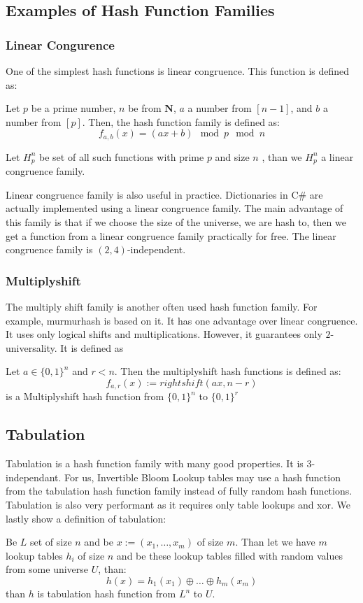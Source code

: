 \subsection{Examples of Hash Function Families}

\subsubsection{Linear Congurence}
One of the simplest hash functions is linear congruence. This function is defined as:
\begin{defn}
    Let \( p \) be a prime number, \(n\)  be from $\mathbf{N}$,  \( a \) a number from \([n-1]\), and \( b \) a number from \([p]\). Then, the hash function family is defined as:
    \[ f_{a,b}(x) = (ax + b) \mod p \mod n\]

    Let $H_p^n$ be set of all such functions with prime $p$ and size $n$ , than we $H_p^n$ a linear congruence family.
\end{defn}
 
Linear congruence family is also useful in practice. Dictionaries in C\# are actually implemented using a linear congruence family. The main advantage of this family is that if we choose the size of the universe, we are hash to, then we get a function from a linear congruence family practically for free. The linear congruence family is $(2,4)$-independent. 

\subsubsection{Multiplyshift}
The multiply shift family is another often used hash function family. For example, murmurhash is based on it. It has one advantage over linear congruence. It uses only logical shifts and multiplications. However, it guarantees only $2$-universality. It is defined as 
\begin{defn}
Let $a \in \{0,1\}^n$ and $r < n$. Then the multiplyshift hash functions is defined as:
$$f_{a,r}(x) :=  rightshift(ax, n - r) $$
is a Multiplyshift hash function from $\{0,1\}^n$ to $\{0,1\}^r$
\end{defn}
\subsection{Tabulation}
Tabulation is a hash function family with many good properties. It is $3$-independant. For us, Invertible Bloom Lookup tables may use a hash function from the tabulation hash function family instead of fully random hash functions. \cite{10.1145/3068772} Tabulation is also very performant as it requires only table lookups and xor.\cite{10.1145/3068772}
We lastly show a definition of tabulation:
\begin{defn}
Be $L$ set of size $n$ and be $x := (x_1, \dots, x_m)$ of size $m$. Than let we have $m$ lookup tables $h_i$ of size $n$ and be these lookup tables filled with random values from some universe $U$, than: 
$$h(x) =  h_1(x_1) \oplus \dots \oplus h_m(x_m)$$
than $h$ is tabulation hash function from $L^n$ to $U$.
\end{defn}


